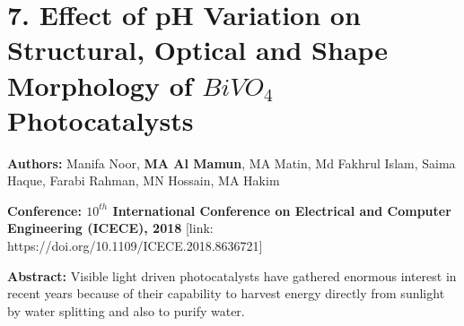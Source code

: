 \documentclass[a4paper,20pt]{article}
\begin{document}
\vspace{5pt}
\section{\textbf{7. Effect of pH Variation on Structural, Optical and Shape Morphology of $BiVO_4$ Photocatalysts}}

\textbf{Authors:} Manifa Noor, \textbf{MA Al Mamun}, MA Matin, Md Fakhrul Islam, Saima Haque, Farabi Rahman, MN Hossain, MA Hakim \\ \vspace{3pt}

\textbf{Conference: $10^{th}$ International Conference on Electrical and Computer Engineering (ICECE), 2018} [link: https://doi.org/10.1109/ICECE.2018.8636721] \\ \vspace{5pt}

\textbf{Abstract:} Visible light driven photocatalysts have gathered enormous interest in recent years because of their capability to harvest energy directly from sunlight by water splitting and also to purify water. \\ \vspace{2pt} 
\end{document}
